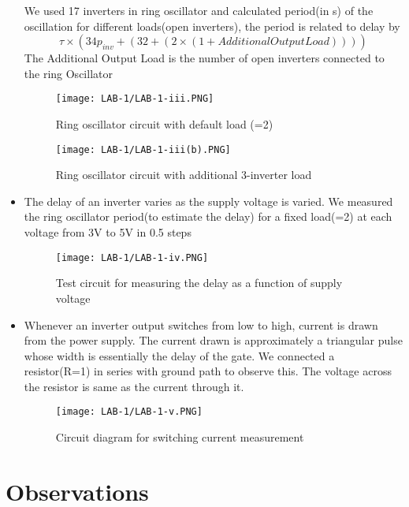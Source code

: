 \documentclass[12pt]{article}
\begin{document}
\begin{itemize}
      \newpage
      We used 17 inverters in ring oscillator and calculated period(in s) of the oscillation for different loads(open inverters), the period is related to delay by
      \begin{equation}
          \tau \times (34p_{inv} + (32 + (2 \times (1 + AdditionalOutputLoad))))
      \end{equation}
      The Additional Output Load is the number of open inverters connected to the ring Oscillator
        \begin{figure}[H]
          \centering
          \texttt{[image: LAB-1/LAB-1-iii.PNG]}
          \caption{Ring oscillator circuit with default load (=2)}
       \end{figure}
       \begin{figure}[H]
         \centering
         \texttt{[image: LAB-1/LAB-1-iii(b).PNG]}
         \caption{Ring oscillator circuit with additional 3-inverter load}
       \end{figure}
    \item The delay of an inverter varies as the supply voltage is varied. We measured the ring oscillator period(to estimate the delay) for a fixed load(=2) at each voltage from 3V to 5V in 0.5 steps
       \begin{figure}[H]
         \centering
         \texttt{[image: LAB-1/LAB-1-iv.PNG]}
         \caption{Test circuit for measuring the delay as a function of supply voltage}
       \end{figure}
       \newpage
    \item Whenever an inverter output switches from low to high, current is drawn from the power supply. The current drawn is approximately a triangular pulse whose width is essentially the delay of the gate. We connected a resistor(R=1) in series with ground path to observe this. The voltage across the resistor is same as the current through it. 
       \begin{figure}[H]
         \centering
         \texttt{[image: LAB-1/LAB-1-v.PNG]}
         \caption{Circuit diagram for switching current measurement}
       \end{figure}
  \end{itemize}
  
  \section{Observations}
\end{document}
